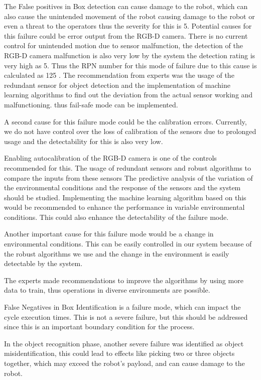 {The False positives in Box detection can cause damage to the robot, which can also cause the unintended movement of the robot causing damage to the robot or even a threat to the operators thus the severity for this is 5. 
Potential causes for this failure could be error output from the RGB-D camera. There is no current control for unintended motion due to sensor malfunction, the detection of the RGB-D camera malfunction is also very low by the system the detection rating is very high as 5.
Thus the RPN number for this mode of failure due to this cause is calculated as 125 .
The recommendation from experts was the usage of the redundant sensor for object detection and the implementation of machine learning algorithms to find out the deviation from the actual sensor working and malfunctioning. thus fail-safe mode can be implemented.

A second cause for this failure mode could be the calibration errors. Currently, we do not have control over the loss of calibration of the sensors due to prolonged usage and the detectability for this is also very low.

Enabling autocalibration of the RGB-D camera is one of the controls recommended for this. The usage of redundant sensors and robust algorithms to compare the inputs from these sensors The predictive analysis of the variation of the environmental conditions and the response of the sensors and the system should be studied. Implementing the machine learning algorithm based on this would be recommended to enhance the performance in variable environmental conditions. This could also enhance the detectability of the failure mode.

Another important cause for this failure mode would be a change in environmental conditions. This can be easily controlled in our system because of the robust algorithms we use and the change in the environment is easily detectable by the system.

The experts made recommendations to improve the algorithms by using more data to train, thus operations in diverse environments are possible.


False Negatives in Box Identification is a failure mode, which can impact the cycle execution times. This is not a severe failure, but this should be addressed since this is an important boundary condition for the process.

In the object recognition phase, another severe failure was identified as object misidentification, this could lead to effects like picking two or three objects together, which may exceed the robot's payload, and can cause damage to the robot.

}
